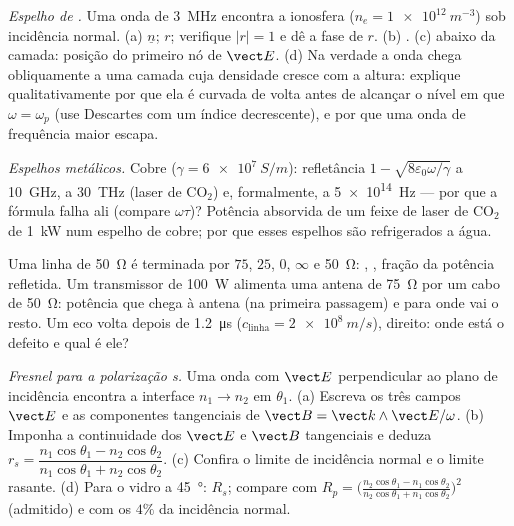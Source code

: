 \begin{exercise}[$\star\star$]\label{exo:b2:wave-interfaces:7}
\emph{Espelho de .} Uma onda de \qty{3}{MHz} encontra a ionosfera ($n_e =
\qty{1e12}{m^{-3}}$) sob incidência normal. (a) $\underline n$; $r$; verifique $|r| = 1$ e
dê a fase de $r$. (b) . (c)  abaixo da
camada: posição do primeiro nó de $\vect E$. (d) Na verdade a onda
chega obliquamente a uma camada cuja densidade cresce com a altura: explique
qualitativamente por que ela é curvada de volta antes de alcançar o nível em que
$\omega = \omega_p$ (use Descartes com um índice decrescente), e por que uma onda de
frequência maior escapa.
\end{exercise}

\begin{exercise}[$\star\star$]\label{exo:b2:wave-interfaces:8}
\emph{Espelhos metálicos.} Cobre ($\gamma = \qty{6e7}{S/m}$): refletância $1 -
\sqrt{8\varepsilon_0\omega/\gamma}$ a \qty{10}{GHz}, a \qty{30}{THz} (laser de CO$_2$) e,
formalmente, a \qty{5e14}{Hz} --- por que a fórmula falha ali (compare
$\omega\tau$)? Potência absorvida de um feixe de laser de CO$_2$ de \qty{1}{kW} num espelho
de cobre; por que esses espelhos são refrigerados a água.
\end{exercise}

\begin{exercise}[$\star\star$]\label{exo:b2:wave-interfaces:9}
Uma linha de \qty{50}{\ohm} é terminada por $75$, $25$, $0$, $\infty$ e \qty{50}{\ohm}:
, , fração da potência
refletida. Um transmissor de \qty{100}{W} alimenta uma antena de \qty{75}{\ohm}
por um cabo de \qty{50}{\ohm}: potência que chega à antena (na primeira passagem)
e para onde vai o resto. Um eco volta depois de \qty{1.2}{\micro s} ($c_{\text{linha}}
= \qty{2e8}{m/s}$), direito: onde está o defeito e qual é ele?
\end{exercise}

\begin{exercise}[$\star\star\star$]\label{exo:b2:wave-interfaces:10}
\emph{Fresnel para a polarização s.} Uma onda com $\vect E$ perpendicular
ao plano de incidência encontra a interface $n_1 \to n_2$ em $\theta_1$.
(a) Escreva os três campos $\vect E$ e as componentes tangenciais de
$\vect B = \vect k\wedge\vect E/\omega$. (b) Imponha a continuidade dos $\vect E$ e $\vect B$
tangenciais e deduza $r_s = \dfrac{n_1\cos\theta_1 - n_2\cos\theta_2}
{n_1\cos\theta_1 + n_2\cos\theta_2}$. (c) Confira o limite de incidência normal e o
limite rasante. (d) Para o vidro a \qty{45}{\degree}: $R_s$; compare com $R_p
= \bigl(\frac{n_2\cos\theta_1 - n_1\cos\theta_2}{n_2\cos\theta_1 + n_1\cos\theta_2}\bigr)^2$
(admitido) e com os $4\%$ da incidência normal.
\end{exercise}

